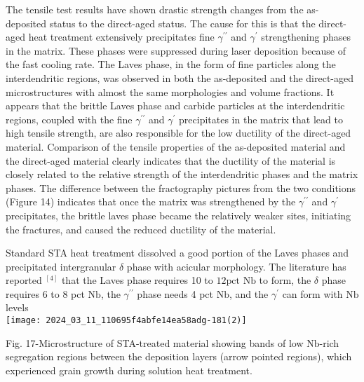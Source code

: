 \documentclass[10pt]{article}
\begin{document}
The tensile test results have shown drastic strength changes from the as-deposited status to the direct-aged status. The cause for this is that the direct-aged heat treatment extensively precipitates fine $\gamma^{\prime \prime}$ and $\gamma^{\prime}$ strengthening phases in the matrix. These phases were suppressed during laser deposition because of the fast cooling rate. The Laves phase, in the form of fine particles along the interdendritic regions, was observed in both the as-deposited and the direct-aged microstructures with almost the same morphologies and volume fractions. It appears that the brittle Laves phase and carbide particles at the interdendritic regions, coupled with the fine $\gamma^{\prime \prime}$ and $\gamma^{\prime}$ precipitates in the matrix that lead to high tensile strength, are also responsible for the low ductility of the direct-aged material. Comparison of the tensile properties of the as-deposited material and the direct-aged material clearly indicates that the ductility of the material is closely related to the relative strength of the interdendritic phases and the matrix phases. The difference between the fractography pictures from the two conditions (Figure 14) indicates that once the matrix was strengthened by the $\gamma^{\prime \prime}$ and $\gamma^{\prime}$ precipitates, the brittle laves phase became the relatively weaker sites, initiating the fractures, and caused the reduced ductility of the material.

Standard STA heat treatment dissolved a good portion of the Laves phases and precipitated intergranular $\delta$ phase with acicular morphology. The literature has reported ${ }^{[4]}$ that the Laves phase requires 10 to $12 \mathrm{pct}$ $\mathrm{Nb}$ to form, the $\delta$ phase requires 6 to 8 pct $\mathrm{Nb}$, the $\gamma^{\prime \prime}$ phase needs 4 pct $\mathrm{Nb}$, and the $\gamma^{\prime}$ can form with $\mathrm{Nb}$ levels\\
\texttt{[image: 2024\_03\_11\_110695f4abfe14ea58adg-181(2)]}

Fig. 17-Microstructure of STA-treated material showing bands of low $\mathrm{Nb}$-rich segregation regions between the deposition layers (arrow pointed regions), which experienced grain growth during solution heat treatment.
\end{document}
